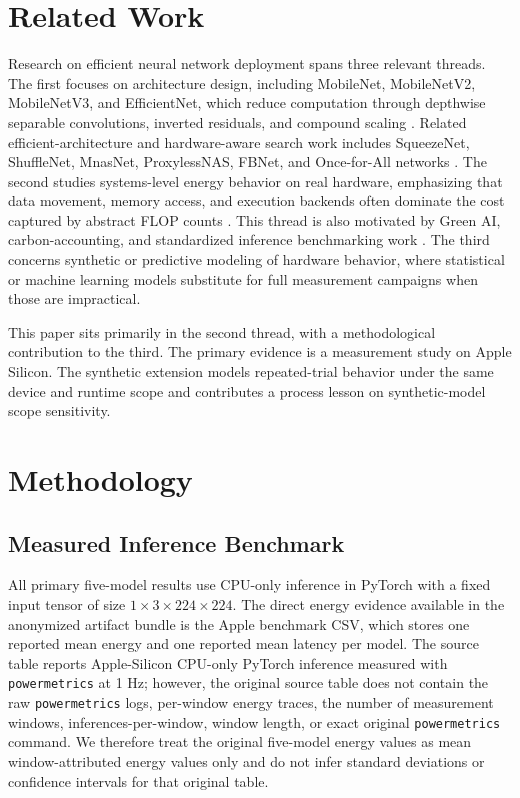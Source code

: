 \documentclass{svproc}
\begin{document}
\section{Related Work}
\begin{sloppypar}
Research on efficient neural network deployment spans three relevant threads.
The first focuses on architecture design, including MobileNet, MobileNetV2,
MobileNetV3, and EfficientNet, which reduce computation through depthwise
separable convolutions, inverted residuals, and compound scaling
\cite{mobilenet2017,mobilenetv22018,mobilenetv32019,efficientnet2019}.
Related efficient-architecture and hardware-aware search work includes
SqueezeNet, ShuffleNet, MnasNet, ProxylessNAS, FBNet, and Once-for-All
networks
\cite{squeezenet2016,shufflenet2018,mnasnet2019,proxylessnas2019,fbnet2019,onceforall2020}.
The second studies systems-level energy behavior on real hardware, emphasizing
that data movement, memory access, and execution backends often dominate the
cost captured by abstract FLOP counts
\cite{horowitz2014,mittal2019,eyeriss2017,hardwareaware2019}. This thread is
also motivated by Green AI, carbon-accounting, and standardized inference
benchmarking work
\cite{greenai2020,strubell2019,patterson2021,mlperf2020}. The third
concerns synthetic or predictive modeling of hardware behavior, where
statistical or machine learning models substitute for full measurement
campaigns when those are impractical.

This paper sits primarily in the second thread, with a methodological
contribution to the third. The primary evidence is a measurement study on
Apple Silicon. The synthetic extension models repeated-trial behavior under
the same device and runtime scope and contributes a process lesson on
synthetic-model scope sensitivity.
\end{sloppypar}

\section{Methodology}

\subsection{Measured Inference Benchmark}
All primary five-model results use CPU-only inference in PyTorch with a fixed
input tensor of size $1 \times 3 \times 224 \times 224$. The direct energy
evidence available in the anonymized artifact bundle is the Apple benchmark
CSV, which stores one reported mean energy and one reported mean latency per
model. The source table reports
Apple-Silicon CPU-only PyTorch inference measured with \texttt{powermetrics} at
1 Hz; however, the original source table does not contain the raw
\texttt{powermetrics} logs, per-window energy traces, the number of
measurement windows, inferences-per-window, window length, or exact original
\texttt{powermetrics} command. We therefore treat the original five-model
energy values as mean window-attributed energy values only and do not infer
standard deviations or confidence intervals for that original table.
\end{document}
